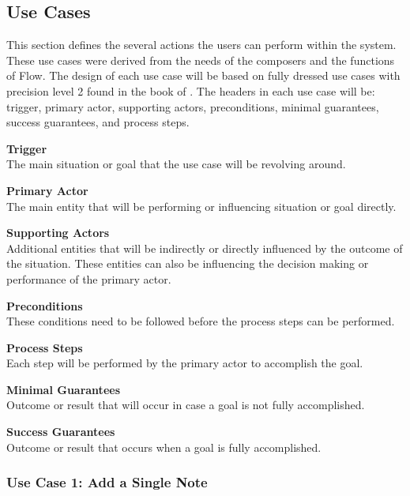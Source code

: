 \subsection{Use Cases}

This section defines the several actions the users can perform within the system. These use cases were derived from the needs of the composers and the functions of Flow. The design of each use case will be based on fully dressed use cases with precision level 2 found in the book of \cite{alistair2001writing}. The headers in each use case will be: trigger, primary actor, supporting actors, preconditions, minimal guarantees, success guarantees, and process steps.

\textbf{Trigger} \\
The main situation or goal that the use case will be revolving around. 

\textbf{Primary Actor} \\
The main entity that will be performing or influencing situation or goal directly.

\textbf{Supporting Actors} \\
Additional entities that will be indirectly or directly influenced by the outcome of the situation. These entities can also be influencing the decision making or performance of the primary actor.

\textbf{Preconditions} \\
These conditions need to be followed before the process steps can be performed.

\textbf{Process Steps} \\
Each step will be performed by the primary actor to accomplish the goal.

\textbf{Minimal Guarantees} \\
Outcome or result that will occur in case a goal is not fully accomplished.

\textbf{Success Guarantees} \\
Outcome or result that occurs when a goal is fully accomplished.




\subsubsection{Use Case 1: Add a Single Note}

